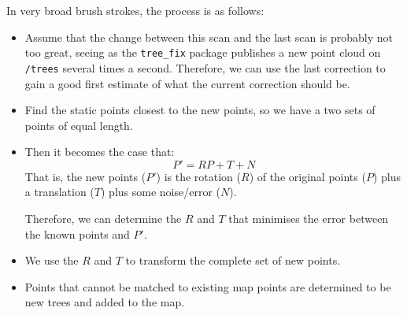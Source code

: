 \documentclass[12pt,oneside,a4paper,draft]{book}
\begin{document}
In very broad brush strokes, the process is as follows:
\begin{itemize}
\item Assume that the change between this scan and the last scan is
  probably not too great, seeing as the \texttt{tree\_fix} package
  publishes a new point cloud on \texttt{/trees} several times a
  second. Therefore, we can use the last correction to gain a good
  first estimate of what the current correction should be.
\item Find the static points closest to the new points, so we have a
  two sets of points of equal length. 
\item Then it becomes the case that:
  \begin{equation}
    \label{eq:1}
    P' = RP + T + N
  \end{equation}
  That is, the new points ($P'$) is the rotation ($R$) of the original
  points ($P$) plus a translation ($T$) plus some noise/error ($N$).

  Therefore, we can determine the $R$ and $T$ that minimises the error
  between the known points and $P'$.
\item We use the $R$ and $T$ to transform the complete set of new
  points. 
\item Points that cannot be matched to existing map points are
  determined to be new trees and added to the map.
\end{itemize}
\end{document}
